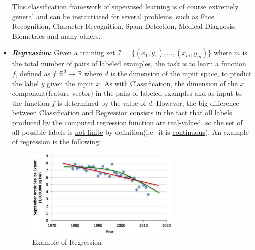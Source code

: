 \begin{itemize}
            \vspace{5mm}

            This classification framework of supervised learning is of
            course extremely general and can be instantiated for
            several problems, such as Face Recognition, Character
            Recognition, Spam Detection, Medical Diagnosis, Biometrics
            and many others.

            \newpage

      \item \emph{\textbf{Regression}}: Given a
            training set $\mathcal{T}=\{(x_1,y_1),...,(x_m,y_m)\}$ where
            $m$ is the total number of pairs of labeled examples,
            the task is to learn a function $f$, defined as
            $f : \mathbb{R}^d \rightarrow \mathbb{R}$ where $d$
            is the dimension of the input space, to predict the label
            $y$ given the input $x$. As with Classification, the
            dimension of the $x$ component(feature vector) in the pairs
            of labeled examples and as input to the function $f$ is
            determined by the value of $d$. However, the big difference
            between Classification and Regression consists in the fact
            that all labels produced by the computed regression function
            are real-valued, so the set of all possible labels is
            \underline{not finite} by definition(i.e.\ it is
            \underline{continuous}). An example of regression is the
            following:

            \vspace{5mm}

            \begin{figure}[h]
                  \centering
                  \includegraphics[width=0.7\textwidth]{../img/Regression_example}
                  \caption{Example of Regression}
            \end{figure}

            \vspace{5mm}


\end{itemize}
